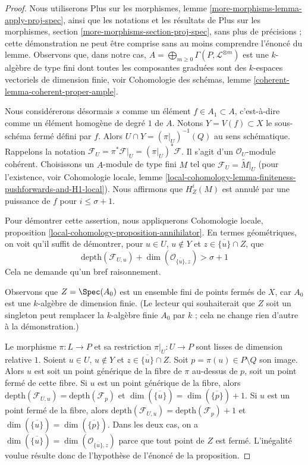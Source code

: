 \begin{proof}
Nous utiliserons Plus sur les morphismes, lemme \ref{more-morphisms-lemma-apply-proj-spec},
ainsi que les notations et les résultats de
Plus sur les morphismes, section \ref{more-morphisms-section-proj-spec},
sans plus de précisions ; cette démonstration ne peut être comprise sans
au moins comprendre l'énoncé du lemme.
Observons que, dans notre cas,
$A = \bigoplus_{m \geq 0} \Gamma(P, \mathcal{L}^{\otimes m})$
est une $k$-algèbre de type fini
dont toutes les composantes graduées sont des $k$-espaces vectoriels de dimension finie, voir
Cohomologie des schémas, lemme \ref{coherent-lemma-coherent-proper-ample}.

\medskip\noindent
Nous considérerons désormais $s$ comme un élément $f \in A_1 \subset A$, c'est-à-dire
comme un élément homogène de degré $1$ de $A$. Notons
$Y = V(f) \subset X$ le sous-schéma fermé défini par $f$.
Alors $U \cap Y = (\pi|_U)^{-1}(Q)$ au sens schématique.
Rappelons la notation
$\mathcal{F}_U = \pi^*\mathcal{F}|_U = (\pi|_U)^*\mathcal{F}$.
Il s'agit d'un $\mathcal{O}_U$-module cohérent.
Choisissons un $A$-module de type fini $M$ tel que
$\mathcal{F}_U = \widetilde{M}|_U$
(pour l'existence, voir Cohomologie locale, lemme
\ref{local-cohomology-lemma-finiteness-pushforwards-and-H1-local}).
Nous affirmons que $H^i_Z(M)$ est annulé par
une puissance de $f$ pour $i \leq \sigma + 1$.

\medskip\noindent
Pour démontrer cette assertion, nous appliquerons
Cohomologie locale, proposition \ref{local-cohomology-proposition-annihilator}.
En termes géométriques, on voit qu'il suffit de démontrer,
pour $u \in U$, $u \not \in Y$ et $z \in \overline{\{u\}} \cap Z$,
que
$$
\text{depth}(\mathcal{F}_{U, u}) +
\dim(\mathcal{O}_{\overline{\{u\}}, z}) > \sigma + 1
$$
Cela ne demande qu'un bref raisonnement.

\medskip\noindent
Observons que $Z = \Spec(A_0)$ est un ensemble fini de points fermés de $X$, car
$A_0$ est une $k$-algèbre de dimension finie.
(Le lecteur qui souhaiterait que $Z$ soit un singleton peut remplacer la
$k$-algèbre finie $A_0$ par $k$ ; cela ne change rien d'autre à la démonstration.)

\medskip\noindent
Le morphisme $\pi : L \to P$ et sa restriction $\pi|_U : U \to P$
sont lisses de dimension relative $1$.
Soient $u \in U$, $u \not \in Y$ et $z \in \overline{\{u\}} \cap Z$.
Soit $p = \pi(u) \in P \setminus Q$ son image.
Alors $u$ est soit un point générique
de la fibre de $\pi$ au-dessus de $p$, soit un point fermé de cette fibre.
Si $u$ est un point générique de la fibre, alors
$\text{depth}(\mathcal{F}_{U, u}) = \text{depth}(\mathcal{F}_p)$
et
$\dim(\overline{\{u\}}) = \dim(\overline{\{p\}}) + 1$.
Si $u$ est un point fermé de la fibre, alors
$\text{depth}(\mathcal{F}_{U, u}) = \text{depth}(\mathcal{F}_p) + 1$
et
$\dim(\overline{\{u\}}) = \dim(\overline{\{p\}})$.
Dans les deux cas, on a
$\dim(\overline{\{u\}}) = \dim(\mathcal{O}_{\overline{\{u\}}, z})$
parce que tout point de $Z$ est fermé. L'inégalité voulue
résulte donc de l'hypothèse de l'énoncé de la
proposition.


\end{proof}
